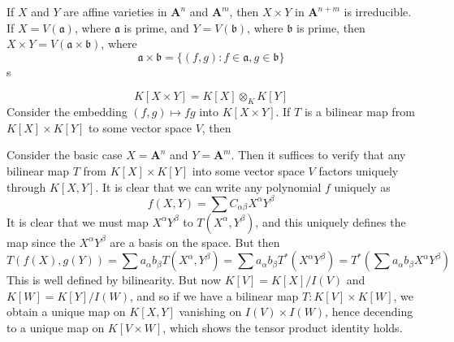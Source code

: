 If $X$ and $Y$ are affine varieties in $\mathbf{A}^n$ and $\mathbf{A}^m$, then $X \times Y$ in $\mathbf{A}^{n+m}$ is irreducible. If $X = V(\mathfrak{a})$, where $\mathfrak{a}$ is prime, and $Y = V(\mathfrak{b})$, where $\mathfrak{b}$ is prime, then $X \times Y = V(\mathfrak{a} \times \mathfrak{b})$, where
%
\[ \mathfrak{a} \times \mathfrak{b} = \{ (f,g) : f \in \mathfrak{a}, g \in \mathfrak{b} \} \]
%
s

\[ K[X \times Y] = K[X] \otimes_K K[Y] \]
%
Consider the embedding $(f,g) \mapsto fg$ into $K[X \times Y]$. If $T$ is a bilinear map from $K[X] \times K[Y]$ to some vector space $V$, then 

Consider the basic case $X = \mathbf{A}^n$ and $Y = \mathbf{A}^m$. Then it suffices to verify that any bilinear map $T$ from $K[X] \times K[Y]$ into some vector space $V$ factors uniquely through $K[X, Y]$. It is clear that we can write any polynomial $f$ uniquely as
%
\[ f(X,Y) = \sum C_{\alpha \beta} X^\alpha Y^\beta \]
%
It is clear that we must map $X^\alpha Y^\beta$ to $T(X^\alpha, Y^\beta)$, and this uniquely defines the map since the $X^\alpha Y^\beta$ are a basis on the space. But then
%
\[ T(f(X), g(Y)) = \sum a_\alpha b_\beta T(X^\alpha, Y^\beta) = \sum a_\alpha b_\beta T^*(X^\alpha Y^\beta) = T^* \left(\sum a_\alpha b_\beta X^\alpha Y^\beta \right) \]
%
This is well defined by bilinearity. But now $K[V] = K[X]/I(V)$ and $K[W] = K[Y]/I(W)$, and so if we have a bilinear map $T: K[V] \times K[W]$, we obtain a unique map on $K[X,Y]$ vanishing on $I(V) \times I(W)$, hence decending to a unique map on $K[V \times W]$, which shows the tensor product identity holds.



